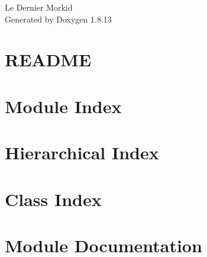 \documentclass[twoside]{book}
\newcommand{\+}{\discretionary{\mbox{\scriptsize$\hookleftarrow$}}{}{}}
\newcommand{\clearemptydoublepage}{%
  \newpage{\pagestyle{empty}\cleardoublepage}%
}
\begin{document}
\hypersetup{pageanchor=false,
             bookmarksnumbered=true,
             pdfencoding=unicode
            }
\begin{titlepage}
\vspace*{7cm}
\begin{center}%
{\Large Le Dernier Morkid }\\
\vspace*{1cm}
{\large Generated by Doxygen 1.8.13}\\
\end{center}
\end{titlepage}
\clearemptydoublepage
{}
\tableofcontents
\clearemptydoublepage
{}
\hypersetup{pageanchor=true}

\chapter{R\+E\+A\+D\+ME}
\label{md__home_louis_projects__le_dernier_morkid__r_e_a_d_m_e}

\chapter{Module Index}

\chapter{Hierarchical Index}

\chapter{Class Index}

\chapter{Module Documentation}




\end{document}
